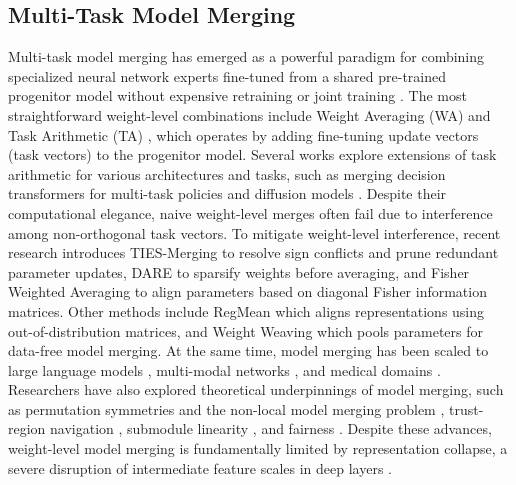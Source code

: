\documentclass{article}
\theoremstyle{plain}
\theoremstyle{definition}
\theoremstyle{remark}
\begin{document}
\subsection{Multi-Task Model Merging}
Multi-task model merging has emerged as a powerful paradigm for combining specialized neural network experts fine-tuned from a shared pre-trained progenitor model without expensive retraining or joint training \cite{wortsman2022model, choshen2022fusing}. The most straightforward weight-level combinations include Weight Averaging (WA) \cite{wortsman2022model, Choi2024RevisitingWA, Meterez2026AnytimePH} and Task Arithmetic (TA) \cite{ilharco2023editing}, which operates by adding fine-tuning update vectors (task vectors) to the progenitor model. Several works explore extensions of task arithmetic for various architectures and tasks, such as merging decision transformers for multi-task policies \cite{Lawson2023MergingDT} and diffusion models \cite{Biggs2024DiffusionSM}. Despite their computational elegance, naive weight-level merges often fail due to interference among non-orthogonal task vectors. To mitigate weight-level interference, recent research introduces TIES-Merging \cite{yadav2023resolving, Yadav2023TIESMergingRI} to resolve sign conflicts and prune redundant parameter updates, DARE \cite{yu2024mergekit} to sparsify weights before averaging, and Fisher Weighted Averaging \cite{matena2022merging} to align parameters based on diagonal Fisher information matrices. Other methods include RegMean \cite{jin2023dataless} which aligns representations using out-of-distribution matrices, and Weight Weaving \cite{Chaves2025WeightWP} which pools parameters for data-free model merging. At the same time, model merging has been scaled to large language models \cite{Song2026ModelMI, Yadav2024WhatMF, Ueda2025MergingCP}, multi-modal networks \cite{Park2025RealAwareRM}, and medical domains \cite{Timilsina2025ANH}. Researchers have also explored theoretical underpinnings of model merging, such as permutation symmetries and the non-local model merging problem \cite{Sharma2024TheNM}, trust-region navigation \cite{Sun2025TaskAI}, submodule linearity \cite{Dai2025LeveragingSL}, and fairness \cite{Naganuma2025OnFO}. Despite these advances, weight-level model merging is fundamentally limited by representation collapse, a severe disruption of intermediate feature scales in deep layers \cite{jordan2023repair}.
\end{document}
